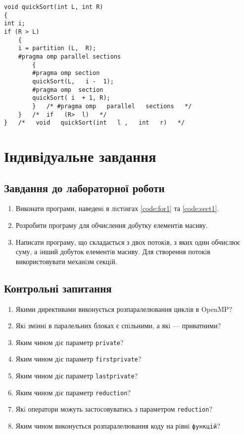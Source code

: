 \begin{lstlisting}[label=code:sect1,caption=Директива omp section]
void quickSort(int L, int R) 
{
int i;
if (R > L)
	{
	i = partition (L,  R); 
	#pragma omp parallel sections
		{
		#pragma omp section
		quickSort(L,   i -  1);
		#pragma omp  section
		quickSort( i  + 1, R);
		}   /* #pragma omp   parallel   sections   */
	}   /*	if   (R>  l)   */
}   /*   void   quickSort(int   l ,   int   r)   */
\end{lstlisting}

\section{Індивідуальне завдання}
\nopagebreak[4]
\subsection*{Завдання до лабораторної роботи}
\nopagebreak[4]
\begin{enumerate}
\item Виконати програми, наведенi в лiстiнгах \ref{code:for1} та \ref{code:sect1}.
\item Розробити програму для обчислення добутку елементiв масиву.
\item Написати програму, що складається з двох потокiв, з яких один обчислює суму, а iнший добуток елементiв масиву. Для створення потокiв використовувати механiзм секцiй.


\end{enumerate}

\subsection*{Контрольні запитання}
\nopagebreak[4]
\begin{enumerate}
\item Якими директивами виконується розпаралелювання циклiв в OpenMP?
\item Якi змiннi в паралельних блоках є спiльними, а якi — приватними?
\item Яким чином дiє параметр \verb'private'?
\item Яким чином дiє параметр \verb'firstprivate'?
\item Яким чином дiє параметр \verb'lastprivate'?
\item Яким чином дiє параметр \verb'reduction'?
\item Якi оператори можуть застосовуватись з параметром \verb'reduction'?
\item Яким чином виконується розпаралелювання коду на рiвнi \verb'функцiй'?
\end{enumerate}



